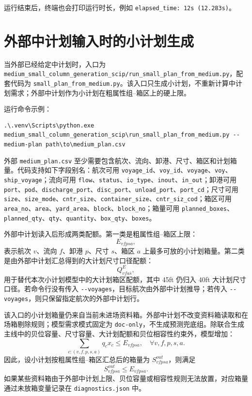 \documentclass[UTF8,a4paper,11pt]{ctexart}
\newcommand{\code}[1]{\nolinkurl{#1}}
\begin{document}
运行结束后，终端也会打印运行时长，例如 \code{elapsed_time: 12s (12.283s)}。

\section{外部中计划输入时的小计划生成}
\label{sec:external-medium-input}

当外部已经给定中计划时，入口为 \code{medium_small_column_generation_scip/run_small_plan_from_medium.py}，配套代码为 \code{small_plan_from_medium.py}。该入口只生成小计划，不重新计算中计划需求；外部中计划作为小计划在粗属性组--箱区上的硬上限。

运行命令示例：
\begin{lstlisting}
.\.venv\Scripts\python.exe medium_small_column_generation_scip\run_small_plan_from_medium.py --medium-plan path\to\medium_plan.csv
\end{lstlisting}

外部 \code{medium_plan.csv} 至少需要包含航次、流向、卸港、尺寸、箱区和计划箱量。代码支持如下字段别名：航次可用 \code{voyage_id}、\code{voy_id}、\code{voyage}、\code{voy}、\code{ship_voyage}；流向可用 \code{flow}、\code{status}、\code{io_type}、\code{inout}、\code{in_out}；卸港可用 \code{port}、\code{pod}、\code{discharge_port}、\code{disc_port}、\code{unload_port}、\code{port_cd}；尺寸可用 \code{size}、\code{size_mode}、\code{cntr_size}、\code{container_size}、\code{cntr_siz_cod}；箱区可用 \code{area_no}、\code{area}、\code{yard_area}、\code{block}、\code{block_no}；箱量可用 \code{planned_boxes}、\code{planned_qty}、\code{qty}、\code{quantity}、\code{box_qty}、\code{boxes}。

外部中计划读入后形成两类配额。第一类是粗属性组--箱区上限：
\[
E_{vfpsa},
\]
表示航次 \(v\)、流向 \(f\)、卸港 \(p\)、尺寸 \(s\)、箱区 \(a\) 上最多可放的小计划箱量。第二类是由外部中计划汇总得到的大计划尺寸口径配额：
\[
Q^{E}_{vfa\bar{s}},
\]
用于替代本次小计划模型中的大计划箱区配额，其中 45ft 仍归入 40ft 大计划尺寸口径。若命令行没有传入 \code{--voyages}，目标航次由外部中计划推导；若传入 \code{--voyages}，则只保留指定航次的外部中计划行。

该入口的小计划箱量仍来自当前未进场资料箱。外部中计划不改变资料箱读取和在场箱剔除规则；模型需求模式固定为 \code{doc-only}，不生成预测兜底组。除联合生成主线中的贝位容量、尺寸容量、大计划配额和贝位相容性约束外，模型增加：
\[
\sum_{c:(v,f,p,s,a)} q_cx_c \le E_{vfpsa},\quad \forall v,f,p,s,a.
\]
因此，设小计划按粗属性组--箱区汇总后的箱量为 \(S^{out}_{vfpsa}\)，则满足
\[
S^{out}_{vfpsa}\le E_{vfpsa}.
\]
如果某些资料箱由于外部中计划上限、贝位容量或相容性规则无法放置，对应箱量通过未放箱变量记录在 \code{diagnostics.json} 中。
\end{document}
